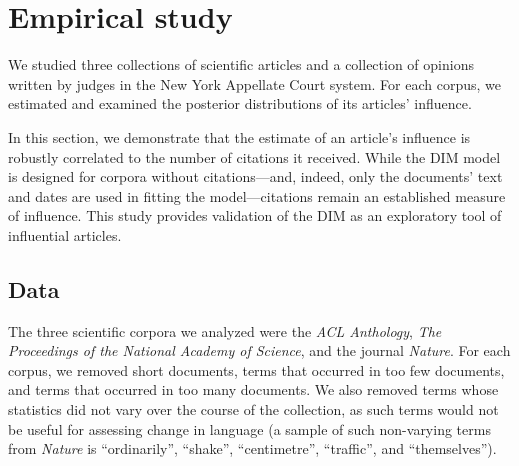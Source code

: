 \section{Empirical study}

We studied three collections of scientific articles and a collection
of opinions written by judges in the New York Appellate Court system.
For each corpus, we estimated and examined the posterior distributions
of its articles' influence.

In this section, we demonstrate that the estimate of an article's
influence is robustly correlated to the number of citations it
received.  While the DIM model is designed for corpora without
citations---and, indeed, only the documents' text and dates are used
in fitting the model---citations remain an established measure of
influence.  This study provides validation of the DIM as an
exploratory tool of influential articles.



\subsection*{Data}
\label{sec:data}




% 

The three scientific corpora we analyzed were the \emph{ACL
  Anthology}, \emph{The Proceedings of the National Academy of
  Science}, and the journal \emph{Nature}.  For each corpus, we
removed short documents, terms that occurred in too few documents, and
terms that occurred in too many documents.  We also removed terms
whose statistics did not vary over the course of the collection, as
such terms would not be useful for assessing change in language (a
sample of such non-varying terms from \emph{Nature} is ``ordinarily'',
``shake'', ``centimetre'', ``traffic'', and ``themselves'').


